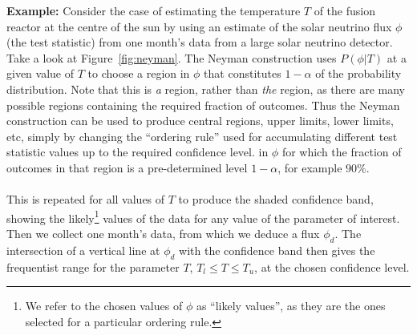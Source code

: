 \begin{tcolorbox}[colback=backblue]
\textbf{Example:} Consider the case of estimating the temperature $T$ of the fusion reactor
 at the centre of the sun by using an estimate of the solar neutrino flux $\phi$ (the test statistic) from one month's data
 from a large solar neutrino detector. Take a look at Figure~\ref{fig:neyman}. The Neyman construction uses $P(\phi|T)$ at a given value of $T$
 to choose a region in $\phi$ that constitutes $1 - \alpha$ of the probability distribution. Note that this is \emph{a} region, rather than \emph{the} region, as there are many
  possible regions containing the required fraction of outcomes. Thus the Neyman construction can be used to
 produce central regions, upper limits, lower limits, etc, simply by changing
  the ``ordering rule'' used for accumulating different test statistic values up to the required confidence level. in $\phi$  for which the fraction of outcomes in that region is a pre-determined level $1 - \alpha$, for example
  $90\%$. \\\\
  This is repeated for all values of $T$ to produce the shaded confidence band, showing the likely\footnote{We refer to the chosen values
  of $\phi$ as ``likely values'', as they are the ones selected for a particular ordering rule.}
  values of the data for any value of the parameter of interest. Then we collect one month's data, from which
  we deduce a flux $\phi_d$. The intersection of a vertical line at $\phi_d$ with the confidence band then
 gives the frequentist range for the parameter $T$, $T_{l} \leq T \leq T_{u}$, at the chosen  confidence level. 
\end{tcolorbox}

